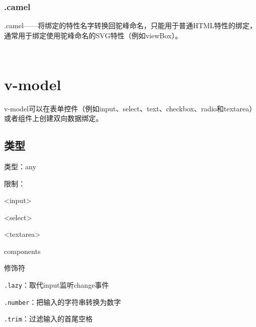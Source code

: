 \subsubsection{.camel}

.camel——将绑定的特性名字转换回驼峰命名，只能用于普通HTML特性的绑定，通常用于绑定使用驼峰命名的SVG特性（例如viewBox）。

\begin{lstlisting}[language=JavaScript]

\end{lstlisting}




\begin{lstlisting}[language=JavaScript]

\end{lstlisting}


\section{v-model}



v-model可以在表单控件（例如input、select、text、checkbox、radio和textarea）或者组件上创建双向数据绑定。


\subsection{类型}

\begin{compactitem}
\item 类型：any
\item 限制：

\begin{compactenum}
\item <input>
\item <select>
\item <textarea>
\item components
\end{compactenum}

\item 修饰符

\begin{compactenum}
\item \texttt{.lazy}：取代input监听change事件
\item \texttt{.number}：把输入的字符串转换为数字
\item \texttt{.trim}：过滤输入的首尾空格
\end{compactenum}

\end{compactitem}

